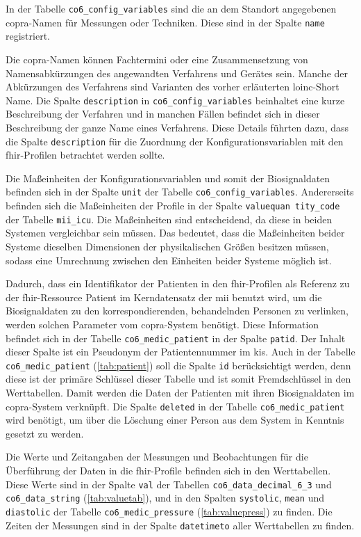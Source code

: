 In der Tabelle \texttt{co6\_config\_variables} sind die an dem Standort angegebenen \ac{copra}-Namen für Messungen oder Techniken. Diese sind in der Spalte \texttt{name} registriert. 

Die \ac{copra}-Namen können Fachtermini oder eine Zusammensetzung von Namensabkürzungen des angewandten Verfahrens und Gerätes sein. Manche der Abkürzungen des Verfahrens sind Varianten des vorher erläuterten \ac{loinc}-\glqq Short Name\grqq{}. Die Spalte \texttt{description} in \texttt{co6\_config\_variables} beinhaltet eine kurze Beschreibung der Verfahren und in manchen Fällen befindet sich in dieser Beschreibung der ganze Name eines Verfahrens. Diese Details führten dazu, dass die Spalte \texttt{description} für die Zuordnung der Konfigurationsvariablen mit den \ac{fhir}-Profilen betrachtet werden sollte.

Die Maßeinheiten der Konfigurationsvariablen und somit der Biosignaldaten befinden sich in der Spalte \texttt{unit} der Tabelle \texttt{co6\_config\_variables}. Andererseits befinden sich die Maßeinheiten der Profile in der Spalte \texttt{valuequan tity\_code} der Tabelle \texttt{mii\_icu}. Die Maßeinheiten sind entscheidend, da diese in beiden Systemen vergleichbar sein müssen. Das bedeutet, dass die Maßeinheiten beider Systeme dieselben Dimensionen der physikalischen Größen besitzen müssen, sodass eine Umrechnung zwischen den Einheiten beider Systeme möglich ist.

Dadurch, dass ein Identifikator der Patienten in den \ac{fhir}-Profilen als Referenz zu der \ac{fhir}-Ressource \glqq Patient\grqq{} im Kerndatensatz der \ac{mii} benutzt wird, um die Biosignaldaten zu den korrespondierenden, behandelnden Personen zu verlinken, werden solchen Parameter vom \ac{copra}-System benötigt. Diese Information befindet sich in der Tabelle \texttt{co6\_medic\_patient} in der Spalte \texttt{patid}. Der Inhalt dieser Spalte ist ein Pseudonym der Patientennummer im \ac{kis}. Auch in der Tabelle \texttt{co6\_medic\_patient} (\ref{tab:patient}) soll  die Spalte \texttt{id} berücksichtigt werden, denn diese ist der primäre Schlüssel dieser Tabelle und ist somit Fremdschlüssel in den Werttabellen. Damit werden die Daten der Patienten mit ihren Biosignaldaten im \ac{copra}-System verknüpft. Die Spalte \texttt{deleted} in der Tabelle \texttt{co6\_medic\_patient} wird benötigt, um über die Löschung einer Person aus dem System in Kenntnis gesetzt zu werden.

Die Werte und Zeitangaben der Messungen und Beobachtungen für die Überführung der Daten in die \ac{fhir}-Profile befinden sich in den Werttabellen. Diese Werte sind in der Spalte \texttt{val} der Tabellen \texttt{co6\_data\_decimal\_6\_3} und \texttt{co6\_data\_string} (\ref{tab:valuetab}), und in den Spalten \texttt{systolic}, \texttt{mean} und \texttt{diastolic} der Tabelle \texttt{co6\_medic\_pressure} (\ref{tab:valuepress}) zu finden. Die Zeiten der Messungen sind in der Spalte \texttt{datetimeto} aller Werttabellen zu finden.

